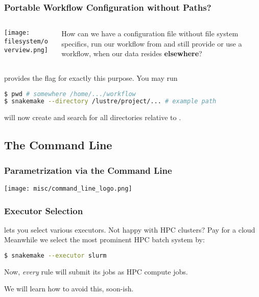\begin{frame}[fragile]
  \frametitle{Portable Workflow Configuration without Paths?}
  \begin{columns}
  	\begin{column}{0.5\textwidth}
  	  \texttt{[image: filesystem/overview.png]}
  	\end{column}
    \begin{column}{0.5\textwidth}
    	\begin{question}
    		How can we have a configuration file without file system specifics, run our workflow from  and still provide or use a workflow, when our data resides \textbf{elsewhere}?
    	\end{question}
    \end{column}
  \end{columns}
  \pause
  \Snakemake provides the  flag for exactly this purpose. You may run
  \begin{lstlisting}[language=Bash, style=Shell]
$ pwd # somewhere /home/.../workflow
$ snakemake --directory /lustre/project/... # example path
  \end{lstlisting}
  \Snakemake will now create and search for all directories relative to .
\end{frame} 

\subsection{The Command Line}

\begin{frame}
  \frametitle{Parametrization via the Command Line}
  \centering
  \texttt{[image: misc/command\_line\_logo.png]}
\end{frame}

\begin{frame}[fragile]
  \frametitle{Executor Selection}
  \Snakemake{} lets you select various executors. Not happy with HPC clusters? Pay for a cloud  \newline
  Meanwhile we select the most prominent HPC batch system by:
  \begin{lstlisting}[language=Bash, style=Shell]
$ snakemake --executor slurm
  \end{lstlisting}
  Now, \emph{every} rule will submit its jobs as HPC compute jobs.
  \begin{hint}
  	We will learn how to avoid this, soon-ish.
  \end{hint}
\end{frame}

